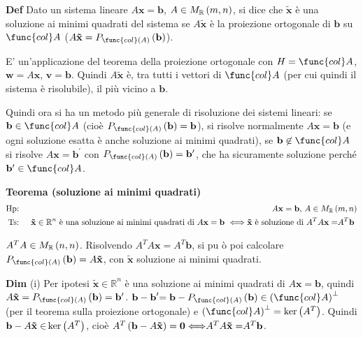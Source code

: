 \documentclass{article}
\begin{document}
\textbf{Def} Dato un sistema lineare $A\mathbf{x=b}$, $A\in M_{%
\mathbb{R}
}\left( m,n\right) $, si dice che $\mathbf{\tilde{x}}$ \`{e} una soluzione
ai minimi quadrati del sistema se $A\mathbf{\tilde{x}}$ \`{e} la proiezione
ortogonale di $\mathbf{b}$ su $\func{col}A$ ($A\mathbf{\tilde{x}}=P_{\func{%
col}\left( A\right) }\left( \mathbf{b}\right) $).

E' un'applicazione del teorema della proiezione ortogonale con $H=\func{col}%
A $, $\mathbf{w}=A\mathbf{x}$, $\mathbf{v=b}$. Quindi $A\mathbf{\tilde{x}}$ 
\`{e}, tra tutti i vettori di $\func{col}A$ (per cui quindi il sistema \`{e}
risolubile), il pi\`{u} vicino a $\mathbf{b}$.

Quindi ora si ha un metodo pi\`{u} generale di risoluzione dei sistemi
lineari: se $\mathbf{b}\in \func{col}A$ (cio\`{e} $P_{\func{col}\left(
A\right) }\left( \mathbf{b}\right) =\mathbf{b}$), si risolve normalmente $A%
\mathbf{x=b}$ (e ogni soluzione esatta \`{e} anche soluzione ai minimi
quadrati), se $\mathbf{b}\not\in \func{col}A$ si risolve $A\mathbf{x=b}%
^{\prime }$ con $P_{\func{col}\left( A\right) }\left( \mathbf{b}\right) =%
\mathbf{b}^{\prime }$, che ha sicuramente soluzione perch\'{e} $\mathbf{b}%
^{\prime }\in \func{col}A$.

\textbf{Teorema (soluzione ai minimi quadrati)} 
\begin{eqnarray*}
\text{Hp}\text{: } &&A\mathbf{x=b}\text{, }A\in M_{%
\mathbb{R}
}\left( m,n\right)  \\
\text{Ts}\text{: } &&\mathbf{\tilde{x}\in 
\mathbb{R}
}^{n}\text{ \`{e} una soluzione ai minimi quadrati di }A\mathbf{x=b}\text{ }%
\Longleftrightarrow \mathbf{\tilde{x}}\text{ \`{e} soluzione di }A^{T}A%
\mathbf{x=}A^{T}\mathbf{b}\text{ }
\end{eqnarray*}

$A^{T}A\in M_{%
\mathbb{R}
}\left( n,n\right) $. Risolvendo $A^{T}A\mathbf{x=}A^{T}\mathbf{b}$, si pu%
\`{o} poi calcolare $P_{\func{col}\left( A\right) }\left( \mathbf{b}\right)
=A\mathbf{\tilde{x}}$, con $\mathbf{\tilde{x}}$ soluzione ai minimi quadrati.

\textbf{Dim} (i) Per ipotesi $\mathbf{\tilde{x}\in 
\mathbb{R}
}^{n}$ \`{e} una soluzione ai minimi quadrati di $A\mathbf{x=b}$, quindi $A%
\mathbf{\tilde{x}}=P_{\func{col}\left( A\right) }\left( \mathbf{b}\right) =%
\mathbf{b}^{\prime }$. $\mathbf{b-b}^{\prime }\mathbf{=b}-P_{\func{col}%
\left( A\right) }\left( \mathbf{b}\right) \in \left( \func{col}A\right)
^{\perp }$ (per il teorema sulla proiezione ortogonale) e $\left( \func{col}%
A\right) ^{\perp }=\ker \left( A^{T}\right) $. Quindi $\mathbf{b}-A\mathbf{%
\tilde{x}\in }\ker \left( A^{T}\right) $, cio\`{e} $A^{T}\left( \mathbf{b}-A%
\mathbf{\tilde{x}}\right) =\mathbf{0\Longleftrightarrow }A^{T}A\mathbf{%
\tilde{x}=}A^{T}\mathbf{b}$.
\end{document}
